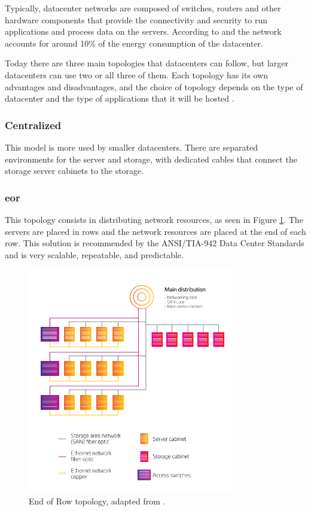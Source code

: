 Typically, datacenter networks are composed of switches, routers and other hardware components that provide the connectivity and security to run applications and process data on the servers. 
According to \citet{Cheung2018} and \citet{Dayarathna2016} the network accounts for around 10\% of the energy consumption of the datacenter. 

Today there are three main topologies that datacenters can follow, but larger datacenters can use two or all three of them. Each topology has its own advantages and disadvantages, and the choice of topology depends on the type of datacenter and the type of applications that it will be hosted \cite{commScope}.

\subsubsection{Centralized}

This model is more used by smaller datacenters. There are separated environments for the server and storage, with dedicated  cables that connect the storage server cabinets to the storage.  

\subsubsection{\ac{eor}}

This topology consists in distributing network resources, as seen in Figure \ref{figure:eor_topology}. The servers are placed in rows and the network resources are placed at the end of each row. This solution is recommended by the  ANSI/TIA-942 Data Center Standards \cite{ANSI/TIA-942} and is very scalable, repeatable, and predictable.

\begin{figure}[h]
    \centering
    \includegraphics[width=0.8\textwidth]{figs/eor_topology.png}
    \caption[End of Row topology.] {End of Row topology, adapted from \citet{commScope}.}
    \label{figure:eor_topology}
\end{figure}


